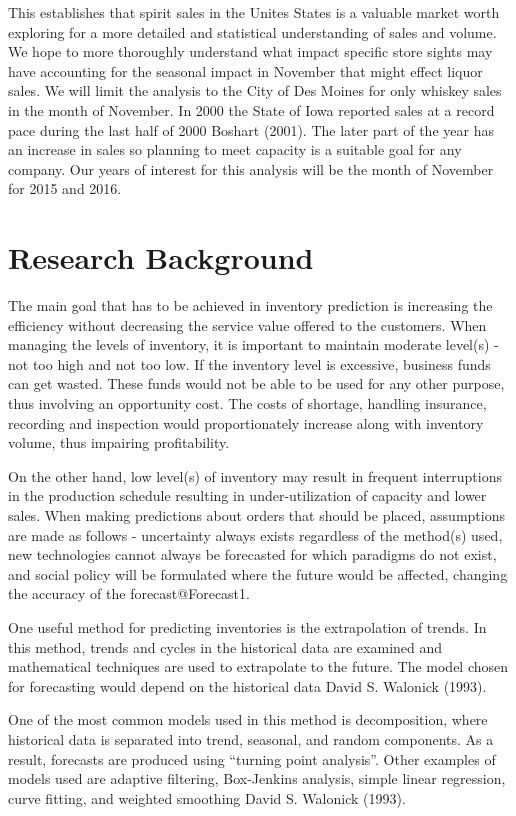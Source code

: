 \documentclass[]{elsarticle} %
\begin{document}
This establishes that spirit sales in the Unites States is a valuable
market worth exploring for a more detailed and statistical understanding
of sales and volume. We hope to more thoroughly understand what impact
specific store sights may have accounting for the seasonal impact in
November that might effect liquor sales. We will limit the analysis to
the City of Des Moines for only whiskey sales in the month of November.
In 2000 the State of Iowa reported sales at a record pace during the
last half of 2000 Boshart (2001). The later part of the year has an
increase in sales so planning to meet capacity is a suitable goal for
any company. Our years of interest for this analysis will be the month
of November for 2015 and 2016.

\section{Research Background}\label{research-background}

The main goal that has to be achieved in inventory prediction is
increasing the efficiency without decreasing the service value offered
to the customers. When managing the levels of inventory, it is important
to maintain moderate level(s) - not too high and not too low. If the
inventory level is excessive, business funds can get wasted. These funds
would not be able to be used for any other purpose, thus involving an
opportunity cost. The costs of shortage, handling insurance, recording
and inspection would proportionately increase along with inventory
volume, thus impairing profitability.

On the other hand, low level(s) of inventory may result in frequent
interruptions in the production schedule resulting in under-utilization
of capacity and lower sales. When making predictions about orders that
should be placed, assumptions are made as follows - uncertainty always
exists regardless of the method(s) used, new technologies cannot always
be forecasted for which paradigms do not exist, and social policy will
be formulated where the future would be affected, changing the accuracy
of the forecast@Forecast1.

One useful method for predicting inventories is the extrapolation of
trends. In this method, trends and cycles in the historical data are
examined and mathematical techniques are used to extrapolate to the
future. The model chosen for forecasting would depend on the historical
data David S. Walonick (1993).

One of the most common models used in this method is decomposition,
where historical data is separated into trend, seasonal, and random
components. As a result, forecasts are produced using ``turning point
analysis''. Other examples of models used are adaptive filtering,
Box-Jenkins analysis, simple linear regression, curve fitting, and
weighted smoothing David S. Walonick (1993).
\end{document}
